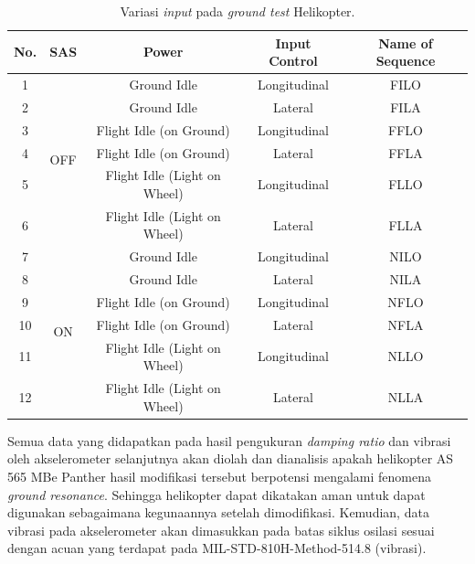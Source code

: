 \begin{longtable}{|c|c|c|c|c|}
	\caption{Variasi \textit{input} pada \textit{ground test} Helikopter.}
	\label{tb:variasi_input}									\\
	\hline
	\textbf{No.} & \textbf{SAS} & \textbf{Power} & \textbf{Input Control} & \textbf{Name of Sequence} \\
	\hline
	1 & \multirow{6}{*}{\centering OFF} & Ground Idle & Longitudinal & FILO \\
	\cline{1-1} \cline{3-5}
	2 && Ground Idle 			      & Lateral      & FILA \\
	\cline{1-1} \cline{3-5}
	3 && Flight Idle (on Ground)      & Longitudinal & FFLO \\
	\cline{1-1} \cline{3-5}
	4 && Flight Idle (on Ground)      & Lateral      & FFLA \\
	\cline{1-1} \cline{3-5}
	5 && Flight Idle (Light on Wheel) & Longitudinal & FLLO \\
	\cline{1-1} \cline{3-5}
	6 && Flight Idle (Light on Wheel) & Lateral      & FLLA \\
	\hline
	7 & \multirow{6}{*}{\centering ON}& Ground Idle  & Longitudinal & NILO \\
	\cline{1-1} \cline{3-5}
	8 && Ground Idle 				  & Lateral      & NILA \\
	\cline{1-1} \cline{3-5}
	9 && Flight Idle (on Ground)      & Longitudinal & NFLO \\
	\cline{1-1} \cline{3-5} 
	10 && Flight Idle (on Ground)     & Lateral      & NFLA \\
	\cline{1-1} \cline{3-5}
	11 && Flight Idle (Light on Wheel)& Longitudinal & NLLO \\
	\cline{1-1} \cline{3-5}
	12 && Flight Idle (Light on Wheel)& Lateral 	 & NLLA \\
	\hline
\end{longtable}

Semua data yang didapatkan pada hasil pengukuran \textit{damping ratio} dan vibrasi oleh akselerometer selanjutnya akan diolah dan dianalisis apakah helikopter AS 565 MBe Panther hasil modifikasi tersebut berpotensi mengalami fenomena \textit{ground resonance}. Sehingga helikopter dapat dikatakan aman untuk dapat digunakan sebagaimana kegunaannya setelah dimodifikasi. Kemudian, data vibrasi pada akselerometer akan dimasukkan pada batas siklus osilasi sesuai dengan acuan yang terdapat pada MIL-STD-810H-Method-514.8 (vibrasi).


